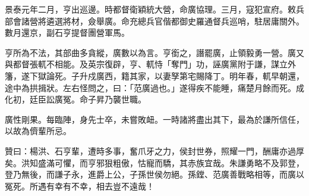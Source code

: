 \begin{pinyinscope}
景泰元年二月，亨出巡邊。時都督衛穎統大營，命廣協理。三月，寇犯宣府。敕兵部會諸營將遴選將材，僉舉廣。命充總兵官偕都御史羅通督兵巡哨，駐居庸關外。數月還京，副石亨提督團營軍馬。

亨所為不法，其部曲多貪縱，廣數以為言。亨銜之，譖罷廣，止領毅勇一營。廣又與都督張軏不相能。及英宗復辟，亨、軏恃「奪門」功，誣廣黨附于謙，謀立外籓，遂下獄論死。子升戍廣西，籍其家，以妻孥第宅賜降丁。明年春，軏早朝還，途中為拱揖狀。左右怪問之，曰：「范廣過也。」遂得疾不能睡，痛楚月餘而死。成化初，廷臣訟廣冤。命子昇乃襲世職。

廣性剛果。每臨陣，身先士卒，未嘗敗衄。一時諸將盡出其下，最為於謙所信任，以故為儕輩所忌。

贊曰：楊洪、石亨輩，遭時多事，奮爪牙之力，侯封世券，照耀一門，酬庸亦過厚矣。洪知盛滿可懼，而亨邪狠粗傲，怙寵而驕，其赤族宜哉。朱謙勇略不及郭登，登乃無後，而謙子永，進爵上公，子孫世侯勿絕。孫鏜、范廣善戰略相等，而廣以冤死。所遇有幸有不幸，相去豈不遠哉！


\end{pinyinscope}